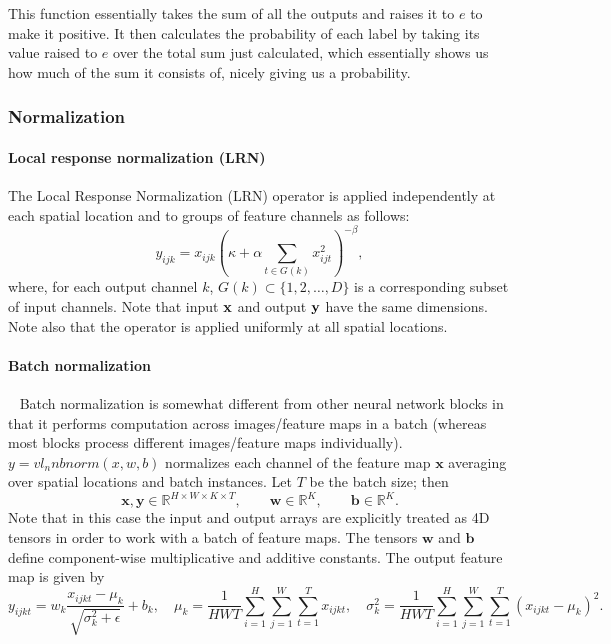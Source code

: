 This function essentially takes the sum of all the outputs and raises it to $e$ to make it positive. It then calculates the probability of each label by taking its value raised to $e$ over the total sum just calculated, which essentially shows us how much of the sum it consists of, nicely giving us a probability.


\subsubsection{Normalization}\label{s:normalization}

\paragraph{Local response normalization (LRN)}\label{s:ccnormalization}

The Local Response Normalization (LRN) operator is applied independently at each spatial location and to groups of feature channels as follows:
\[
y_{ijk} = x_{ijk} \left( \kappa + \alpha \sum_{t\in G(k)} x_{ijt}^2 \right)^{-\beta},
\]
where, for each output channel $k$, $G(k) \subset \{1, 2, \dots, D\}$ is a corresponding subset of input channels. Note that input $\mathbf{x}$ and output $\mathbf{y}$ have the same dimensions. Note also that the operator is applied uniformly at all spatial locations.


\paragraph{Batch normalization}\label{s:bnorm}

~\cite{ioffe2015} Batch normalization is somewhat different from other neural network blocks in that it performs computation across images/feature maps in a batch (whereas most blocks process different images/feature maps individually). $y = vl_nnbnorm(x, w, b)$ normalizes each channel of the feature map $\mathbf{x}$ averaging over spatial locations and batch instances. Let $T$ be the batch size; then
\[
\mathbf{x}, \mathbf{y} \in \mathbb{R}^{H \times W \times K \times T},
\qquad\mathbf{w} \in \mathbb{R}^{K},
\qquad\mathbf{b} \in \mathbb{R}^{K}.
\]
Note that in this case the input and output arrays are explicitly treated as 4D tensors in order to work with a batch of feature maps. The tensors  $\mathbf{w}$ and $\mathbf{b}$ define component-wise multiplicative and additive constants. The output feature map is given by
\[
y_{ijkt} = w_k \frac{x_{ijkt} - \mu_{k}}{\sqrt{\sigma_k^2 + \epsilon}} + b_k,
\quad
\mu_{k} = \frac{1}{HWT}\sum_{i=1}^H \sum_{j=1}^W \sum_{t=1}^{T} x_{ijkt},
\quad
\sigma^2_{k} = \frac{1}{HWT}\sum_{i=1}^H \sum_{j=1}^W \sum_{t=1}^{T} (x_{ijkt} - \mu_{k})^2.
\]


